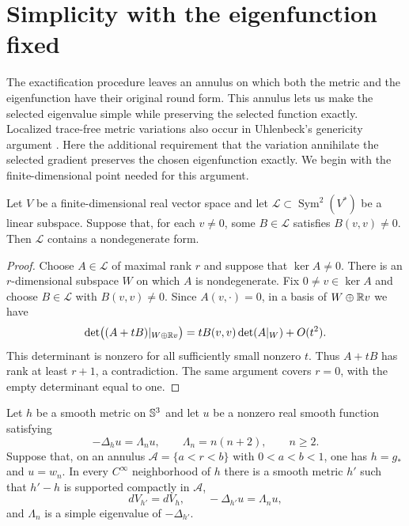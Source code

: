 \section{Simplicity with the eigenfunction fixed}
\label{sec:pinning}

The exactification procedure leaves an annulus on which both the metric
and the eigenfunction have their original round form.  This annulus lets
us make the selected eigenvalue simple while preserving the selected
function exactly. Localized trace-free metric variations also occur in
Uhlenbeck's genericity argument \cite[Section~4, Example~2]{Uhlenbeck1976}.
Here the additional requirement that the variation annihilate the
selected gradient preserves the chosen eigenfunction exactly.
We begin with the finite-dimensional point needed for this argument.

\begin{lemma}\label{lem:nondegenerate-pencil}
Let $V$ be a finite-dimensional real vector space and let
$\mathcal L\subset\operatorname{Sym}^2(V^*)$ be a linear subspace.
Suppose that, for each $v\ne0$, some $B\in\mathcal L$ satisfies
$B(v,v)\ne0$.  Then $\mathcal L$ contains a nondegenerate form.
\end{lemma}

\begin{proof}
Choose $A\in\mathcal L$ of maximal rank $r$ and suppose that
$\ker A\ne0$.  There is an $r$-dimensional subspace $W$ on which $A$
is nondegenerate.  Fix $0\ne v\in\ker A$ and choose $B\in\mathcal L$
with $B(v,v)\ne0$.  Since $A(v,\cdot)=0$, in a basis of
$W\oplus\mathbb R v$ we have
\[
 \det\bigl((A+tB)|_{W\oplus\mathbb R v}\bigr)
 =tB(v,v)\det(A|_W)+O(t^2).
\]
This determinant is nonzero for all sufficiently small nonzero $t$.
Thus $A+tB$ has rank at least $r+1$, a contradiction.  The same
argument covers $r=0$, with the empty determinant equal to one.
\end{proof}

\begin{proposition}
\label{prop:pinned-simplicity}
Let $h$ be a smooth metric on $\mathbb S^3$ and let $u$ be a nonzero real
smooth function satisfying
\[
 -\Delta_hu=\Lambda_nu,\qquad \Lambda_n=n(n+2),\qquad n\ge2.
\]
Suppose that, on an annulus
$\mathcal A=\{a<r<b\}$ with $0<a<b<1$, one has $h=g_*$ and $u=w_n$.
In every $C^\infty$ neighborhood of $h$ there is a smooth metric
$h'$ such that $h'-h$ is supported compactly in $\mathcal A$,
\[
 dV_{h'}=dV_h,\qquad -\Delta_{h'}u=\Lambda_nu,
\]
and $\Lambda_n$ is a simple eigenvalue of $-\Delta_{h'}$.
\end{proposition}

